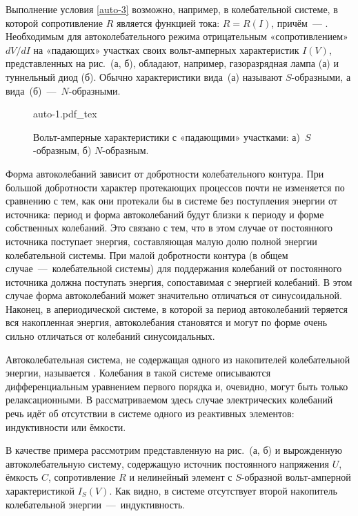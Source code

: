Выполнение условия \eqref{auto-3} возможно, например, в 
колебательной системе, в которой сопротивление $R$ является функцией тока:
$R=R(I)$, причём~--- . Необходимым для
автоколебательного режима отрицательным «сопротивлением» ${dV}/{dI}$ на
«падающих» участках своих вольт-амперных характеристик $I(V)$, представленных на
рис.~(а, б), обладают, например, газоразрядная лампа (а) и туннельный
диод (б). Обычно характеристики вида~(а) называют $S$-образными, а
вида~(б)~---~$N$-образными.
\begin{figure}
	\centering
	\def\svgwidth{0.9\textwidth}
	{auto-1.pdf_tex}
	\caption{Вольт-амперные характеристики с «падающими» участками: а)~$S$-образным, б) $N$-образным.}
\end{figure}

Форма автоколебаний зависит от добротности колебательного контура. При большой
добротности характер протекающих процессов почти не изменяется по сравнению с
тем, как они протекали бы в системе без поступления
энергии от источника: период и форма автоколебаний будут близки к периоду и
форме собственных колебаний. Это связано с тем, что в этом случае от постоянного
источника поступает энергия, составляющая малую
долю полной энергии колебательной системы. При малой добротности контура (в
общем случае~---~колебательной системы) для поддержания колебаний от постоянного
источника должна поступать энергия, сопоставимая с энергией колебаний. В этом
случае форма автоколебаний может значительно отличаться от синусоидальной.
Наконец, в апериодической системе, в которой за период автоколебаний теряется вся
накопленная энергия, автоколебания становятся  и
могут по форме очень сильно отличаться от колебаний синусоидальных.

Автоколебательная система, не содержащая одного из накопителей колебательной
энергии, называется . Колебания в такой системе
описываются дифференциальным уравнением первого порядка и, очевидно, могут быть
только релаксационными. В рассматриваемом здесь случае электрических колебаний
речь идёт об отсутствии в системе одного из реактивных элементов: индуктивности
или ёмкости.

В качестве примера рассмотрим представленную на рис.~(а, б) и вырожденную автоколебательную систему, содержащую источник
постоянного напряжения $U$, ёмкость $C$, сопротивление $R$ и нелинейный элемент
с $S$-образной вольт-амперной характеристикой $I_S(V)$. Как видно, в системе
отсутствует второй накопитель колебательной энергии~---~индуктивность.

